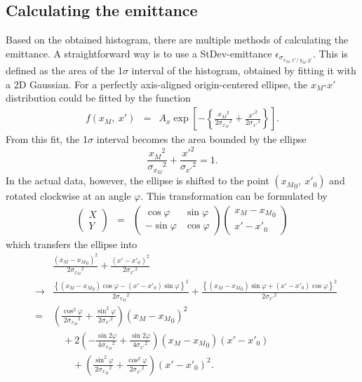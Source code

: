 \documentclass{article}
\begin{document}
\subsection{Calculating the emittance}
Based on the obtained histogram, there are multiple methods of calculating the emittance. A straightforward way is to use a StDev-emittance $\epsilon_{\sigma_{x_M,x'/\ y_M,y'}}$. This is defined as the area of the 1$\sigma$ interval of the histogram, obtained by fitting it with a 2D Gaussian. For a perfectly axis-aligned origin-centered ellipse, the $x_M$-$x'$ distribution could be fitted by the function
\begin{eqnarray*}
f(x_M,\ x') & = & A_x \exp{\left[ -\left\{ \frac{{x_M}^2}{2{\sigma_{x_M}}^2} + \frac{{x'}^2}{2{\sigma_{x'}}^2} \right\}\right]}.
\end{eqnarray*}
From this fit, the 1$\sigma$ interval becomes the area bounded by the ellipse 
\begin{equation*}
\frac{{x_M}^2}{{\sigma_{x_M}}^2} + \frac{{x'}^2}{{\sigma_{x'}}^2} = 1.
\end{equation*}
In the actual data, however, the ellipse is shifted to the point $\left({x_M}_0,\ {x'}_0\right)$ and rotated clockwise at an angle $\varphi$. This transformation can be formulated by
\begin{eqnarray*}
\left(
\begin{array}{c}
	X \\
	Y
\end{array} \right) & = & \left(
\begin{array}{cc}
	\cos{\varphi} & \sin{\varphi} \\
	-\sin{\varphi} & \cos{\varphi}
\end{array} \right) \left(
\begin{array}{c}
	x_M - {x_M}_0 \\
	x' - {x'}_0
\end{array} \right)
\end{eqnarray*}
which transfers the ellipse into
\begin{eqnarray*}
& & \frac{\left(x_M-{x_M}_0\right)^2}{2{\sigma_{x_M}}^2} + \frac{\left(x'-{x'}_0\right)^2}{2{\sigma_{x'}}^2} \\
& \rightarrow & \frac{\left\{ \left(x_M-{x_M}_0\right)\cos{\varphi} - \left(x'-{x'}_0\right)\sin{\varphi} \right\}^2}{2{\sigma_{x_M}}^2} + \frac{\left\{ \left(x_M-{x_M}_0\right)\sin{\varphi} + \left(x'-{x'}_0\right)\cos{\varphi} \right\}^2}{2{\sigma_{x'}}^2} \\
& = & \left( \frac{\cos^2{\varphi}}{2{\sigma_{x_M}}^2} + \frac{\sin^2{\varphi}}{2{\sigma_{x'}}^2} \right) \left( x_M-{x_M}_0 \right)^2 \\
& & \, \, \, \, \, \, + 2 \left( -\frac{\sin{2\varphi}}{4{\sigma_{x_M}}^2} + \frac{\sin{2\varphi}}{4{\sigma_{x'}}^2} \right) \left( x_M-{x_M}_0 \right) \left( x'-{x'}_0 \right) \\
& & \, \, \, \, \, \, \, \, \, \, \, \, + \left( \frac{\sin^2{\varphi}}{2{\sigma_{x_M}}^2} + \frac{\cos^2{\varphi}}{2{\sigma_{x'}}^2} \right) \left( x'-{x'}_0 \right)^2 .
\end{eqnarray*}
\end{document}
